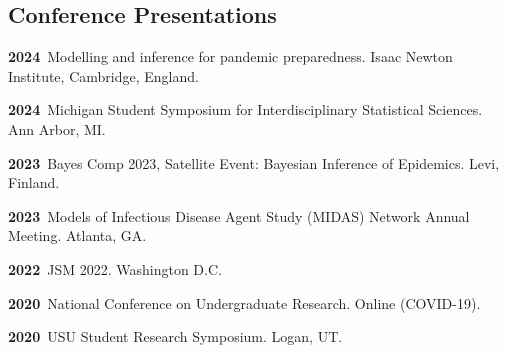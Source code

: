 \documentclass[11pt] {article}
\newenvironment {reflist}
                {
                 \begin{list}{}
                 {\setlength{\labelwidth}{0mm}
                  \setlength{\leftmargin}{8mm}
                  \setlength{\itemindent}{-3mm}
                  \setlength{\labelsep}{0mm}
                  \setlength{\parsep}{0.1 ex}
                  \setlength{\itemsep}{0.1cm}
      \setlength{\topsep}{0.15cm}}} %
   {\end{list}}
\begin{document}
\subsection*{Conference Presentations}

\begin{reflist}

    \item \textbf{2024}\, Modelling and inference for pandemic preparedness. Isaac Newton Institute, Cambridge, England.

    \item \textbf{2024}\, Michigan Student Symposium for Interdisciplinary Statistical Sciences. Ann Arbor, MI.

    \item \textbf{2023}\, Bayes Comp 2023, Satellite Event: Bayesian Inference of Epidemics. Levi, Finland.

    \item \textbf{2023}\, Models of Infectious Disease Agent Study (MIDAS) Network Annual Meeting. Atlanta, GA.

    \item \textbf{2022}\, JSM 2022. Washington D.C.

     \item \textbf{2020}\, National Conference on Undergraduate Research. Online (COVID-19).

    \item \textbf{2020}\, USU Student Research Symposium. Logan, UT.


\end{reflist}
\end{document}
